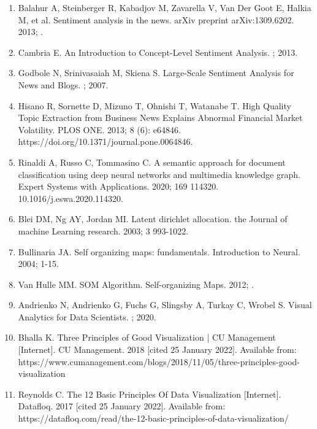 \begin{enumerate}
     \item \hypertarget{20}{Balahur A, Steinberger R, Kabadjov M, Zavarella V, Van Der Goot E, Halkia M, et al. Sentiment analysis in the news. arXiv preprint arXiv:1309.6202. 2013; .}
     
     \item \hypertarget{21}{ Cambria E. An Introduction to Concept-Level Sentiment Analysis. ; 2013.}
     
     \item \hypertarget{22}{ Godbole N, Srinivasaiah M, Skiena S. Large-Scale Sentiment Analysis for News and Blogs. ; 2007.}
     
     \item \hypertarget{23}{ Hisano R, Sornette D, Mizuno T, Ohnishi T, Watanabe T. High Quality Topic Extraction from Business News Explains Abnormal Financial Market Volatility. PLOS ONE. 2013; 8 (6): e64846. https://doi.org/10.1371/journal.pone.0064846.}
     
     \item \hypertarget{24}{ Rinaldi A, Russo C, Tommasino C. A semantic approach for document classification using deep neural networks and multimedia knowledge graph. Expert Systems with Applications. 2020; 169 114320. 10.1016/j.eswa.2020.114320.}
    
    \item \hypertarget{25}{ Blei DM, Ng AY, Jordan MI. Latent dirichlet allocation. the Journal of machine Learning research. 2003; 3 993-1022.}
     
    \item \hypertarget{26}{Bullinaria JA. Self organizing maps: fundamentals. Introduction to Neural. 2004; 1-15.}

    \item \hypertarget{27}{ Van Hulle MM. SOM Algorithm. Self-organizing Maps. 2012; .}

     \item \hypertarget{28}{Andrienko N, Andrienko G, Fuchs G, Slingsby A, Turkay C, Wrobel S. Visual Analytics for Data Scientists. ; 2020.}
     
     \item \hypertarget{29}{Bhalla K. Three Principles of Good Visualization | CU Management [Internet]. CU Management. 2018 [cited 25 January 2022]. Available from: https://www.cumanagement.com/blogs/2018/11/05/three-principles-good-visualization}
     

     \item \hypertarget{30}{Reynolds C. The 12 Basic Principles Of Data Visualization [Internet]. Datafloq. 2017 [cited 25 January 2022]. Available from: https://datafloq.com/read/the-12-basic-principles-of-data-visualization/}
    

\end{enumerate}
